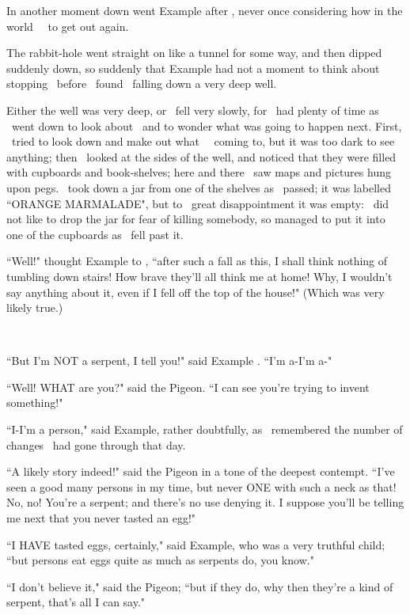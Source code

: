 \documentclass{article}
\begin{document}
\set
In another moment down went Example after \them[2], never once considering how in the world \they\ \were\ to get out again.

\set
The rabbit-hole went straight on like a tunnel for some way, and then dipped suddenly down, so suddenly that Example had not a moment to think about stopping \themself\ before \they\ found \themself\ falling down a very deep well.

\set
Either the well was very deep, or \they\ fell very slowly, for \they\ had plenty of time as \they\ went down to look about \them\ and to wonder what was going to happen next. First, \they\ tried to look down and make out what \they\ \were\ coming to, but it was too dark to see anything; then \they\ looked at the sides of the well, and noticed that they were filled with cupboards and book-shelves; here and there \they\ saw maps and pictures hung upon pegs. \they\ took down a jar from one of the shelves as \they\ passed; it was labelled ``ORANGE MARMALADE", but to \their\ great disappointment it was empty: \they\ did not like to drop the jar for fear of killing somebody, so managed to put it into one of the cupboards as \they\ fell past it.

\set
``Well!" thought Example to \themself, ``after such a fall as this, I shall think nothing of tumbling down stairs! How brave they'll all think me at home! Why, I wouldn't say anything about it, even if I fell off the top of the house!" (Which was very likely true.)

~

``But I'm NOT a serpent, I tell you!" said Example . ``I'm a-I'm a-"

``Well! WHAT are you?" said the Pigeon. ``I can see you're trying to invent something!"

\set
``I-I'm a person," said Example, rather doubtfully, as \they\ remembered the number of changes \they\ had gone through that day.

``A likely story indeed!" said the Pigeon in a tone of the deepest contempt. ``I've seen a good many persons in my time, but never ONE with such a neck as that! No, no! You're a serpent; and there's no use denying it. I suppose you'll be telling me next that you never tasted an egg!"

``I HAVE tasted eggs, certainly," said Example, who was a very truthful child; ``but persons eat eggs quite as much as serpents do, you know."

\set
``I don't believe it," said the Pigeon; ``but if they do, why then they're a kind of serpent, that's all I can say."
\end{document}
